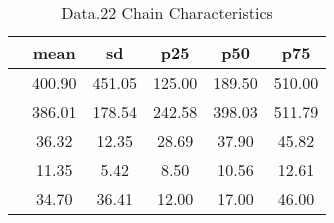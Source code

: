 \begin{table}[htbp]
\caption{\label{clabel} Data.22 Chain Characteristics}\centering\medskip
\begin{tabular}{lccccc} \hline \hline
 & mean  & sd  & p25  & p50  & p75  \\  \hline 
 &       400.90 &       451.05 &       125.00 &       189.50 &       510.00 \\  
 &       386.01 &       178.54 &       242.58 &       398.03 &       511.79 \\  
 &        36.32 &        12.35 &        28.69 &        37.90 &        45.82 \\  
 &        11.35 &         5.42 &         8.50 &        10.56 &        12.61 \\  
 &        34.70 &        36.41 &        12.00 &        17.00 &        46.00 \\  
\hline \hline \end{tabular}
\end{table}
